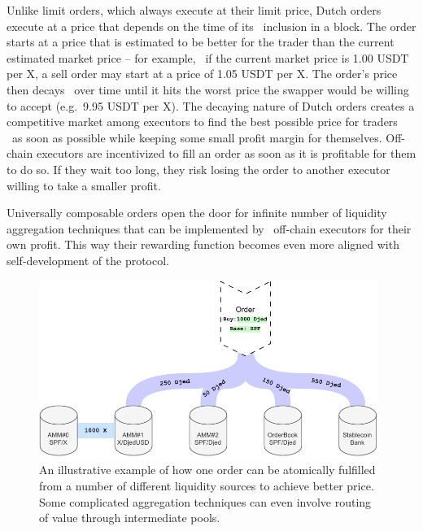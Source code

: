 \documentclass[11pt]{article}
\begin{document}
\begin{sloppypar}
        \newpage
        Unlike limit orders, which always execute at their limit price, Dutch orders execute at a price that depends on the time of its \
        inclusion in a block.
        The order starts at a price that is estimated to be better for the trader than the current estimated market price -- for example, \
        if the current market price is 1.00 USDT per X, a sell order may start at a price of 1.05 USDT per X. The order’s price then decays \
        over time until it hits the worst price the swapper would be willing to accept (e.g.\ 9.95 USDT per X).
        The decaying nature of Dutch orders creates a competitive market among executors to find the best possible price for traders \
        as soon as possible while keeping some small profit margin for themselves.
        Off-chain executors are incentivized to fill an order as soon as it is profitable for them to do so.
        If they wait too long, they risk losing the order to another executor willing to take a smaller profit.

        \newpage
        Universally composable orders open the door for infinite number of liquidity aggregation techniques that can be implemented by \
        off-chain executors for their own profit.
        This way their rewarding function becomes even more aligned with self-development of the protocol.

        \begin{figure}[h!]
            \centering
            \includegraphics[width=0.98\textwidth]{order_composition}
            \caption{An illustrative example of how one order can be atomically fulfilled from a number of
            different liquidity sources to achieve better price. Some complicated aggregation techniques
            can even involve routing of value through intermediate pools.}
            \label{fig:figure4}
        \end{figure}


\end{sloppypar}
\end{document}
